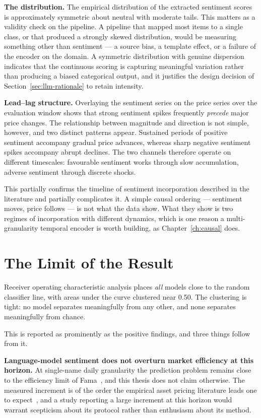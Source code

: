 \textbf{The distribution.} The empirical distribution of the extracted sentiment scores is
approximately symmetric about neutral with moderate tails. This matters as a validity check on the
pipeline. A pipeline that mapped most items to a single class, or that produced a strongly skewed
distribution, would be measuring something other than sentiment --- a source bias, a template
effect, or a failure of the encoder on the domain. A symmetric distribution with genuine
dispersion indicates that the continuous scoring is capturing meaningful variation rather than
producing a biased categorical output, and it justifies the design decision of
Section~\ref{sec:llm-rationale} to retain intensity.

\textbf{Lead--lag structure.} Overlaying the sentiment series on the price series over the
evaluation window shows that strong sentiment spikes frequently \emph{precede} major price
changes. The relationship between magnitude and direction is not simple, however, and two distinct
patterns appear. Sustained periods of positive sentiment accompany gradual price advances, whereas
sharp negative sentiment spikes accompany abrupt declines. The two channels therefore operate on
different timescales: favourable sentiment works through slow accumulation, adverse sentiment
through discrete shocks.

This partially confirms the timeline of sentiment incorporation described in the literature and
partially complicates it. A simple causal ordering --- sentiment moves, price follows --- is not
what the data show. What they show is two regimes of incorporation with different dynamics, which
is one reason a multi-granularity temporal encoder is worth building, as
Chapter~\ref{ch:causal} does.

\section{The Limit of the Result}
\label{sec:llm-limit}

Receiver operating characteristic analysis places \emph{all} models close to the random classifier
line, with areas under the curve clustered near 0.50. The clustering is tight: no model separates
meaningfully from any other, and none separates meaningfully from chance.

This is reported as prominently as the positive findings, and three things follow from it.

\textbf{Language-model sentiment does not overturn market efficiency at this horizon.} At
single-name daily granularity the prediction problem remains close to the efficiency limit of
Fama~\cite{fama1970}, and this thesis does not claim otherwise. The measured increment is of the
order the empirical asset pricing literature leads one to expect~\cite{gu2020}, and a study
reporting a large increment at this horizon would warrant scepticism about its protocol rather
than enthusiasm about its method.

